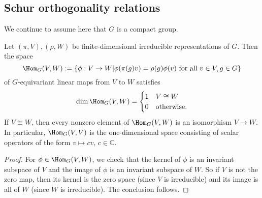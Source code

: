 \documentclass[reqno]{amsart} 
\def\eps{\varepsilon}
\begin{document}

\subsection{Schur orthogonality relations}
\label{sec:orga60f514}
We continue to assume here
that $G$ is a compact group.
\begin{lemma}\label{lem:schur-lemma-for-morphisms}
  Let $(\pi,V), (\rho,W)$ be finite-dimensional irreducible
  representations of $G$.
  Then the space
  \begin{equation*}
  \Hom_G(V,W)
  :=
  \{\phi : V \rightarrow W \lvert \phi(\pi(g) v) = \rho(g) \phi(v) \text{ for all } v \in V, g \in G \}
  \end{equation*}
  of $G$-equivariant linear maps
  from $V$ to $W$ satisfies
  \begin{equation*}
  \dim \Hom_G(V,W)
  = 
\begin{cases}
    1 & V \cong W \\
    0 & \text{otherwise.}
  \end{cases}
  \end{equation*}
  If $V \cong W$,
  then every nonzero element
  of $\Hom_G(V,W)$ is an isomorphism $V \rightarrow W$.
  In particular, $\Hom_G(V,V)$ is the one-dimensional space
  consisting of scalar operators of the form $v \mapsto c v$,
  $c \in \mathbb{C}$.
\end{lemma}
\begin{proof}
  For $\phi \in \Hom_G(V,W)$,
  we check that the kernel of $\phi$ is an invariant subspace
  of $V$ and the image of $\phi$ is an invariant subspace of
  $W$.
  So if $V$ is not the zero map, then its kernel is the zero
  space (since $V$ is irreducible)
  and its image is all of $W$ (since $W$ is irreducible).
  The conclusion follows.
\end{proof}
\end{document}
